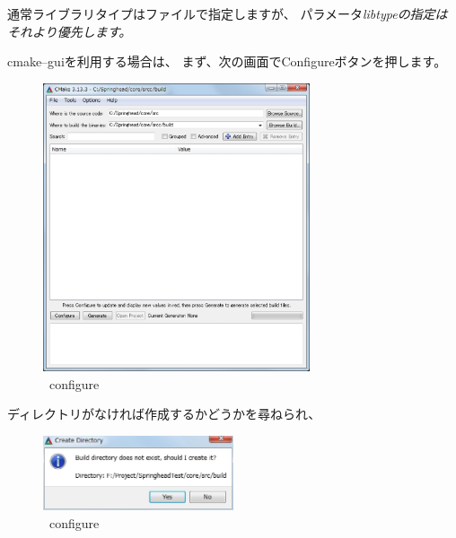 通常ライブラリタイプはファイル\Path{\CMakeSettings{}}で指定しますが、
パラメータ\it{libtype}の指定はそれより優先します。

\bigskip
cmake--guiを利用する場合は、
まず、次の画面でConfigureボタンを押します。
\newpage
\begin{narrow}[15pt]
	\begin{figure}[h]
	\begin{center}
	\includegraphics[width=0.7\textwidth]{fig/CmakeConfigure1.eps}
	\end{center}
	\caption{\cmake\ configure}
	\label{fig:CmakeConfigure}
	\end{figure}
\end{narrow}

\DQuote{\BldDir}ディレクトリがなければ作成するかどうかを尋ねられ、
\begin{narrow}[15pt]
	\begin{figure}[h]
	\begin{center}
	\includegraphics[width=0.5\textwidth]{fig/CmakeConfigure2.eps}
	\end{center}
	\caption{\cmake\ configure}
	\label{fig:CreateWorkSpace}
	\end{figure}
\end{narrow}

